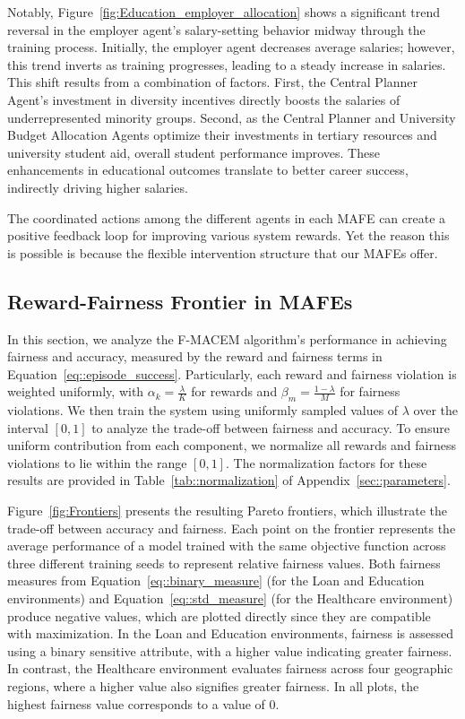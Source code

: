 Notably, Figure~\ref{fig:Education_employer_allocation} shows a significant trend reversal in the employer agent’s salary-setting behavior midway through the training process. Initially, the employer agent decreases average salaries; however, this trend inverts as training progresses, leading to a steady increase in salaries. This shift results from a combination of factors. First, the Central Planner Agent’s investment in diversity incentives directly boosts the salaries of underrepresented minority groups. Second, as the Central Planner and University Budget Allocation Agents optimize their investments in tertiary resources and university student aid, overall student performance improves. These enhancements in educational outcomes translate to better career success, indirectly driving higher salaries.

The coordinated actions among the different agents in each MAFE can create a positive feedback loop for improving various system rewards. Yet the reason this is possible is because the flexible intervention structure that our MAFEs offer. 

\subsection{Reward-Fairness Frontier in MAFEs}

In this section, we analyze the F-MACEM algorithm's performance in achieving fairness and accuracy, measured by the reward and fairness terms in Equation~\ref{eq::episode_success}. Particularly, each reward and fairness violation is weighted uniformly, with $\alpha_k=\frac{\lambda}{K}$ for rewards and $\beta_m=\frac{1-\lambda}{M}$ for fairness violations. We then train the system using uniformly sampled values of $\lambda$ over the interval $[0,1]$ to analyze the trade-off between fairness and accuracy. To ensure uniform contribution from each component, we normalize all rewards and fairness violations to lie within the range $[0,1]$. The normalization factors for these results are provided in Table~\ref{tab::normalization} of Appendix~\ref{sec::parameters}.

Figure~\ref{fig:Frontiers} presents the resulting Pareto frontiers, which illustrate the trade-off between accuracy and fairness. Each point on the frontier represents the average performance of a model trained with the same objective function across three different training seeds to represent relative fairness values.
Both fairness measures from Equation~\ref{eq::binary_measure} (for the Loan and Education environments) and Equation~\ref{eq::std_measure} (for the Healthcare environment) produce negative values, which are plotted directly since they are compatible with maximization. In the Loan and Education environments, fairness is assessed using a binary sensitive attribute, with a higher value indicating greater fairness. In contrast, the Healthcare environment evaluates fairness across four geographic regions, where a higher value also signifies greater fairness. In all plots, the highest fairness value corresponds to a value of 0.

